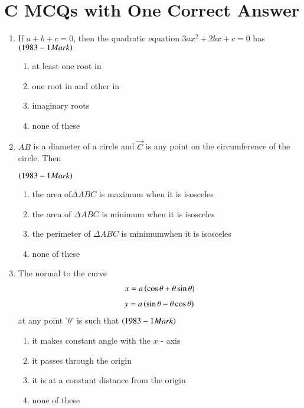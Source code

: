 \documentclass[journal,12pt,onecolumn]{IEEEtran}
\theoremstyle{remark}
\begin{document}
\section{C MCQs with One Correct Answer}

\begin{enumerate}

\item If $a+b+c = 0$, then the quadratic equation $3ax^2 + 2bx + c = 0$
has \hfill$\left(1983 - 1 Mark\right)$
\begin{enumerate}
	\item at least one root in
	\item one root in  and other in 
        \item imaginary roots
	\item none of these
\end{enumerate}

 \item $AB$ is a diameter of a circle and $\vec C$ is any point on the
circumference of the circle. Then

\hfill$\left(1983 - 1 Mark\right)$
\begin{enumerate}
	\item the area of$\Delta ABC$ is maximum when it is isosceles
	\item the area of $\Delta ABC$ is minimum when it is isosceles
	\item the perimeter of $\Delta ABC$ is minimumwhen it is isosceles
	\item none of these
\end{enumerate}

\item The normal to the curve 
\begin{align*}x = a\left(\cos \theta + \theta\sin \theta\right)
\end{align*}
\begin{align*}y = a\left(\sin \theta - \theta\cos \theta\right)
\end{align*}
at any point '$\theta$' is such that \hfill$\left(1983 - 1 Mark\right)$
\begin{enumerate}
	\item it makes  constant angle with the $x$ - axis
	\item it passes through the origin
	\item it is at a constant distance from the origin
	\item none of these
\end{enumerate}


\end{enumerate}
\end{document}
